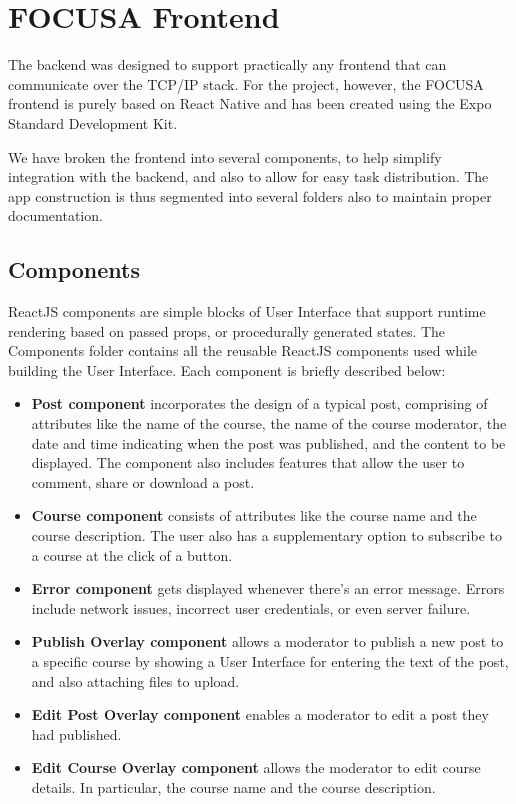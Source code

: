 \section{FOCUSA Frontend}
The backend was designed to support practically any frontend that can communicate over the TCP/IP stack.
For the project, however, the FOCUSA frontend is purely based on React Native and has been created using the Expo Standard Development Kit. 

We have broken the frontend into several components, to help simplify integration with the backend, 
and also to allow for easy task distribution. The app construction is thus segmented into several folders also to maintain proper documentation.

\subsection{Components}
ReactJS components are simple blocks of User Interface that support runtime rendering based on passed props, 
or procedurally generated states.
The Components folder contains all the reusable ReactJS components used while building the User Interface. 
Each component is briefly described below:
\begin{itemize}
    \item \textbf{Post component} incorporates the design of a typical post, comprising of attributes like the name of the course, the name of the course moderator, the date and time indicating when the post was published, and the content to be displayed. The component also includes features that allow the user to comment, share or download a post.
    \item \textbf{Course component} consists of attributes like the course name and the course description. 
    The user also has a supplementary option to subscribe to a course at the click of a button.
    \item \textbf{Error component} gets displayed whenever there's an error message. Errors include network issues, 
    incorrect user credentials, or even server failure.
    \item \textbf{Publish Overlay component} allows a moderator to publish a new post to a specific course by showing a 
    User Interface for entering the text of the post, and also attaching files to upload.
    \item \textbf{Edit Post Overlay component} enables a moderator to edit a post they had published.
    \item \textbf{Edit Course Overlay component} allows the moderator to edit course details. In particular, the course name and the course description.
\end{itemize}

